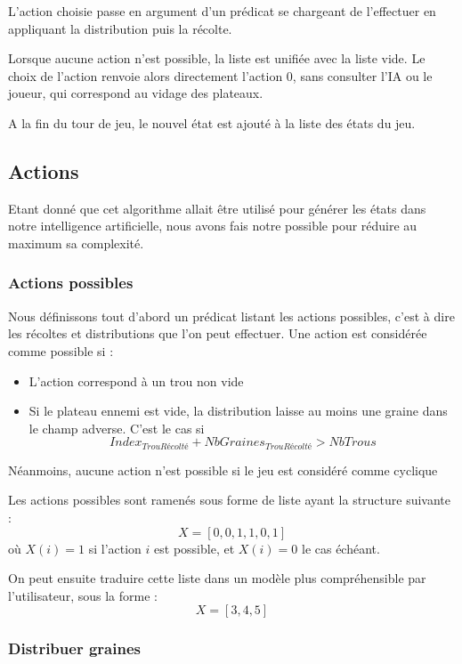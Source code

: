\documentclass[]{article}
\begin{document}
L'action choisie passe en argument d'un prédicat se chargeant de l'effectuer en appliquant la distribution puis la récolte.

Lorsque aucune action n'est possible, la liste est unifiée avec la liste vide. Le choix de l'action renvoie alors directement l'action 0, sans consulter l'IA ou le joueur, qui correspond au vidage des plateaux.

A la fin du tour de jeu, le nouvel état est ajouté à la liste des états du jeu.

\subsection{Actions}

Etant donné que cet algorithme allait être utilisé pour générer les états dans notre intelligence artificielle, nous avons fais notre possible pour réduire au maximum sa complexité.

\subsubsection{Actions possibles}

Nous définissons tout d'abord un prédicat listant les actions possibles, c'est à dire les récoltes et distributions que l'on peut effectuer. Une action est considérée comme possible si : 
\begin{itemize}
\item L'action correspond à un trou non vide
\item Si le plateau ennemi est vide, la distribution laisse au moins une graine dans le champ adverse. C'est le cas si 
$$Index_{TrouRécolté} + NbGraines_{TrouRécolté} > NbTrous$$
\end{itemize}

Néanmoins, aucune action n'est possible si le jeu est considéré comme cyclique

Les actions possibles sont ramenés sous forme de liste ayant la structure suivante : 
$$X = [0,0,1,1,0,1]$$ où $X(i) = 1$ si l'action $i$ est possible, et $X(i) = 0$ le cas échéant.

On peut ensuite traduire cette liste dans un modèle plus compréhensible par l'utilisateur, sous la forme :
$$X = [3,4,5]$$

\subsubsection{Distribuer graines}
\end{document}
